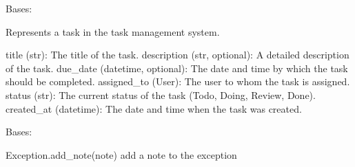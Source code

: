 \documentclass[letterpaper,10pt,english]{sphinxmanual}
\begin{document}
\begin{fulllineitems}
\label{\detokenize{tasks:tasks.models.Task}}
\pysigstartsignatures
{}
\pysigstopsignatures
\sphinxAtStartPar
Bases: 

\sphinxAtStartPar
Represents a task in the task management system.
\begin{description}
\sphinxAtStartPar
title (str): The title of the task.
description (str, optional): A detailed description of the task.
due\_date (datetime, optional): The date and time by which the task should be completed.
assigned\_to (User): The user to whom the task is assigned.
status (str): The current status of the task (Todo, Doing, Review, Done).
created\_at (datetime): The date and time when the task was created.

\end{description}

\begin{fulllineitems}
\label{\detokenize{tasks:tasks.models.Task.DoesNotExist}}
\pysigstartsignatures
{}
\pysigstopsignatures
\sphinxAtStartPar
Bases: 

\begin{fulllineitems}
\label{\detokenize{tasks:tasks.models.Task.DoesNotExist.__init__}}
\pysigstartsignatures
{}
\pysigstopsignatures
\end{fulllineitems}


\begin{fulllineitems}
\label{\detokenize{tasks:tasks.models.Task.DoesNotExist.add_note}}
\pysigstartsignatures
{}
\pysigstopsignatures
\sphinxAtStartPar
Exception.add\_note(note) \textendash{}
add a note to the exception


\end{fulllineitems}
\end{fulllineitems}
\end{fulllineitems}
\end{document}
